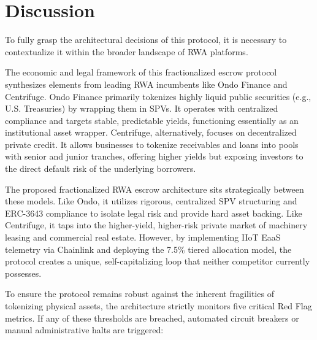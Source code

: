 \documentclass{Resources/bdlt-project}
\begin{document}
\section{Discussion}
To fully grasp the architectural decisions of this protocol, it is necessary to contextualize it within the broader landscape of RWA platforms.

The economic and legal framework of this fractionalized escrow protocol synthesizes elements from leading RWA incumbents like Ondo Finance and Centrifuge. Ondo Finance primarily tokenizes highly liquid public securities (e.g., U.S. Treasuries) by wrapping them in SPVs. It operates with centralized compliance and targets stable, predictable yields, functioning essentially as an institutional asset wrapper. Centrifuge, alternatively, focuses on decentralized private credit. It allows businesses to tokenize receivables and loans into pools with senior and junior tranches, offering higher yields but exposing investors to the direct default risk of the underlying borrowers.

The proposed fractionalized RWA escrow architecture sits strategically between these models. Like Ondo, it utilizes rigorous, centralized SPV structuring and ERC-3643 compliance to isolate legal risk and provide hard asset backing. Like Centrifuge, it taps into the higher-yield, higher-risk private market of machinery leasing and commercial real estate. However, by implementing IIoT EaaS telemetry via Chainlink and deploying the 7.5\% tiered allocation model, the protocol creates a unique, self-capitalizing loop that neither competitor currently possesses.

To ensure the protocol remains robust against the inherent fragilities of tokenizing physical assets, the architecture strictly monitors five critical Red Flag metrics. If any of these thresholds are breached, automated circuit breakers or manual administrative halts are triggered:
\end{document}

